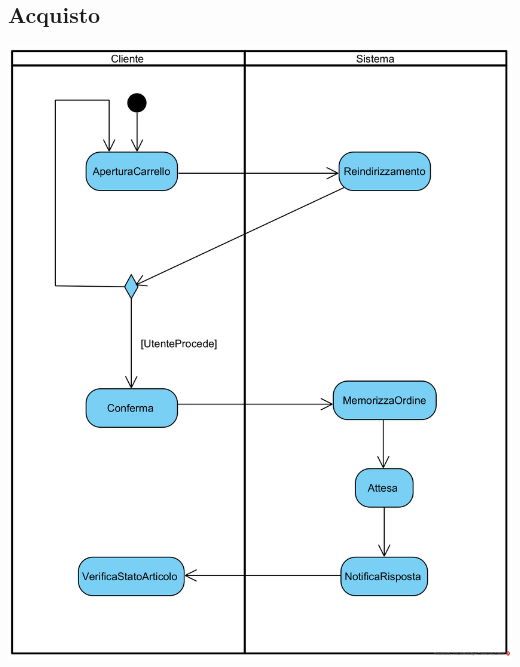 \documentclass[12pt,a4paper]{article}
\begin{document}
\subsection{Acquisto}
\begin{center}
\includegraphics[width=\textwidth]{ActivityDiagram/AcquistoArticolo}
\end{center}
\end{document}
